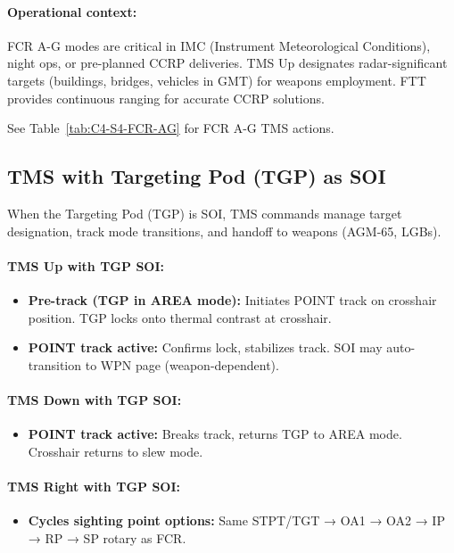 \documentclass[11pt, a4paper, twoside]{report}
\begin{document}
\paragraph{Operational context:}
FCR A-G modes are critical in IMC (Instrument Meteorological Conditions), night ops, or pre-planned CCRP deliveries. TMS Up designates radar-significant targets (buildings, bridges, vehicles in GMT) for weapons employment. FTT provides continuous ranging for accurate CCRP solutions.

See Table~\ref{tab:C4-S4-FCR-AG} for FCR A-G TMS actions.

\subsection{TMS with Targeting Pod (TGP) as SOI}
\label{sec:C4-S4-S2}

When the Targeting Pod (TGP) is SOI, TMS commands manage target designation, track mode transitions, and handoff to weapons (AGM-65, LGBs).

\paragraph{TMS Up with TGP SOI:}
\begin{itemize}
    \item \textbf{Pre-track (TGP in AREA mode):} Initiates POINT track on crosshair position. TGP locks onto thermal contrast at crosshair.
    \item \textbf{POINT track active:} Confirms lock, stabilizes track. SOI may auto-transition to WPN page (weapon-dependent).
\end{itemize}

\paragraph{TMS Down with TGP SOI:}
\begin{itemize}
    \item \textbf{POINT track active:} Breaks track, returns TGP to AREA mode. Crosshair returns to slew mode.
\end{itemize}

\paragraph{TMS Right with TGP SOI:}
\begin{itemize}
    \item \textbf{Cycles sighting point options:} Same STPT/TGT → OA1 → OA2 → IP → RP → SP rotary as FCR.
\end{itemize}
\end{document}
